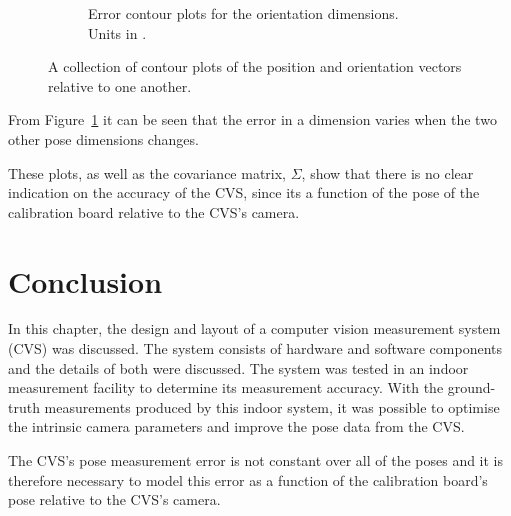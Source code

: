 \begin{figure}
\begin{subfigure}{0.48\textwidth}
\begin{subfigure}{\textwidth}
    \end{subfigure}
    \caption{Error contour plots for the orientation dimensions. Units in \textdegree.}
  \end{subfigure}
  \caption[A collection of contour plots of the position and orientation vectors relative to one another]{A collection of contour plots of the position and orientation vectors relative to one another.}
  \label{fig:err-contour}
\end{figure}

From Figure~\ref{fig:err-contour} it can be seen that the error in a dimension varies when the two other pose dimensions changes. 

These plots, as well as the covariance matrix, $\Sigma$, show that there is no clear indication on the accuracy of the CVS, since its a function of the pose of the calibration board relative to the CVS's camera. 

\section{Conclusion}

In this chapter, the design and layout of a computer vision measurement system (CVS) was discussed. The system consists of hardware and software components and the details of both were discussed. The system was tested in an indoor measurement facility to determine its measurement accuracy. With the ground-truth measurements produced by this indoor system, it was possible to optimise the intrinsic camera parameters and improve the pose data from the CVS.

The CVS's pose measurement error is not constant over all of the poses and it is therefore necessary to model this error as a function of the calibration board's pose relative to the CVS's camera. 
